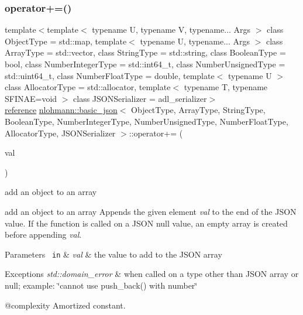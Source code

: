 \subsubsection{\texorpdfstring{operator+=()}{operator+=()}\hspace{0.1cm}{\footnotesize\ttfamily [2/4]}}
{\footnotesize\ttfamily template$<$template$<$ typename U, typename V, typename... Args $>$ class Object\+Type = std\+::map, template$<$ typename U, typename... Args $>$ class Array\+Type = std\+::vector, class String\+Type  = std\+::string, class Boolean\+Type  = bool, class Number\+Integer\+Type  = std\+::int64\+\_\+t, class Number\+Unsigned\+Type  = std\+::uint64\+\_\+t, class Number\+Float\+Type  = double, template$<$ typename U $>$ class Allocator\+Type = std\+::allocator, template$<$ typename T, typename S\+F\+I\+N\+A\+E=void $>$ class J\+S\+O\+N\+Serializer = adl\+\_\+serializer$>$ \\
\mbox{\hyperlink{classnlohmann_1_1basic__json_ac6a5eddd156c776ac75ff54cfe54a5bc}{reference}} \mbox{\hyperlink{classnlohmann_1_1basic__json}{nlohmann\+::basic\+\_\+json}}$<$ Object\+Type, Array\+Type, String\+Type, Boolean\+Type, Number\+Integer\+Type, Number\+Unsigned\+Type, Number\+Float\+Type, Allocator\+Type, J\+S\+O\+N\+Serializer $>$\+::operator+= (\begin{DoxyParamCaption}\item[{const \mbox{\hyperlink{classnlohmann_1_1basic__json}{basic\+\_\+json}}$<$ Object\+Type, Array\+Type, String\+Type, Boolean\+Type, Number\+Integer\+Type, Number\+Unsigned\+Type, Number\+Float\+Type, Allocator\+Type, J\+S\+O\+N\+Serializer $>$ \&}]{val }\end{DoxyParamCaption})\hspace{0.3cm}{\ttfamily [inline]}}



add an object to an array 

add an object to an array Appends the given element {\itshape val} to the end of the J\+S\+ON value. If the function is called on a J\+S\+ON null value, an empty array is created before appending {\itshape val}.


\begin{DoxyParams}[1]{Parameters}
\mbox{\texttt{ in}}  & {\em val} & the value to add to the J\+S\+ON array\\
\hline
\end{DoxyParams}

\begin{DoxyExceptions}{Exceptions}
{\em std\+::domain\+\_\+error} & when called on a type other than J\+S\+ON array or null; example\+: {\ttfamily \char`\"{}cannot use push\+\_\+back() with number\char`\"{}}\\
\hline
\end{DoxyExceptions}
@complexity Amortized constant.

